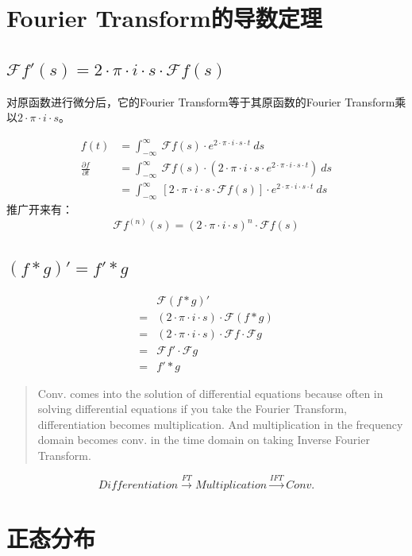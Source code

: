\section{Fourier Transform的导数定理}
\subsection{$\mathcal{F}f'(s)=2\cdot \pi\cdot i\cdot s\cdot \mathcal{F}f(s)$}
对原函数进行微分后，它的Fourier Transform等于其原函数的Fourier Transform乘以$2\cdot \pi\cdot i\cdot s$。

\begin{align*}
	f(t)                          & =\int_{-\infty}^{\infty}\ \mathcal{F}f(s)\cdot e^{2\cdot \pi\cdot i\cdot s\cdot t}\ ds                                 \\
	\frac{\partial f}{\partial t} & =\int_{-\infty}^{\infty}\ \mathcal{F}f(s)\cdot(2\cdot \pi\cdot i\cdot s\cdot e^{2\cdot \pi\cdot i\cdot s\cdot t})\ ds  \\
	                              & =\int_{-\infty}^{\infty}\ [2\cdot \pi\cdot i\cdot s\cdot \mathcal{F}f(s)]\cdot e^{2\cdot \pi\cdot i\cdot s\cdot t}\ ds
\end{align*}
推广开来有：
$$
	\mathcal{F}f^{(n)}(s)=(2\cdot \pi\cdot i\cdot s)^n\cdot \mathcal{F}f(s)
$$
\subsection{$(f*g)'=f'*g$}
\begin{align*}
	  & \mathcal{F}(f*g)'                                              \\
	= & (2\cdot \pi\cdot i\cdot s)\cdot \mathcal{F}(f*g)               \\
	= & (2\cdot \pi\cdot i\cdot s)\cdot \mathcal{F}f\cdot \mathcal{F}g \\
	= & \mathcal{F}f'\cdot \mathcal{F}g                                \\
	= & f'*g
\end{align*}
\begin{quote}
	Conv. comes into the solution of differential equations because often in solving differential equations if you take the Fourier Transform, differentiation becomes multiplication. And multiplication in the frequency domain becomes conv. in the time domain on taking Inverse Fourier Transform.
\end{quote}
$$
	Differentiation\stackrel{FT}\longrightarrow Multiplication\stackrel{IFT}\longrightarrow Conv.
$$
\section{正态分布}
